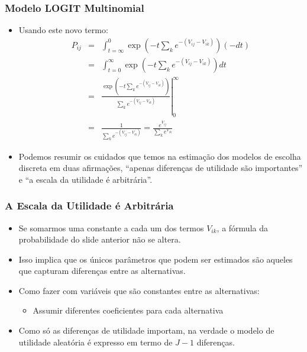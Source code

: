 \documentclass{beamer}
\begin{document}
\begin{frame}\frametitle{Modelo LOGIT Multinomial}
\begin{itemize}
\item Usando este novo termo:
\begin{eqnarray*}
P_{ij} & = & \int_{t=\infty}^{0}\exp\left(-t\sum_{k}e^{-(V_{ij}-V_{ik})}\right)(-dt)\\
 & = & \int_{t=0}^{\infty}\exp\left(-t\sum_{k}e^{-(V_{ij}-V_{ik})}\right)dt\\
 & = & \left.\frac{\exp\left(-t\sum_{k}e^{-(V_{ij}-V_{ik})}\right)}{\sum_{k}e^{-(V_{ij}-V_{ik})}}\right|_{0}^{\infty}\\
 & = & \frac{1}{\sum_{k}e^{-(V_{ij}-V_{ik})}}=\frac{e^{V_{ij}}}{\sum_{k}e^{V_{ik}}}
\end{eqnarray*}
\item Podemos resumir os cuidados que temos na estimação dos modelos de
escolha discreta em duas afirmações, ``apenas diferenças
de utilidade são importantes'' e ``a escala da
utilidade é arbitrária''. 
\end{itemize}

\end{frame}

\begin{frame}[fragile]\frametitle{A Escala da Utilidade é Arbitrária}
    \begin{itemize}
    	\item Se somarmos uma constante a cada um dos termos $V_{ik}$, a fórmula da probabilidade do slide anterior não se altera.
    	\item Isso implica que os únicos parâmetros que podem ser estimados são aqueles que capturam diferenças entre as alternativas.
    	\item Como fazer com variáveis que são constantes entre as alternativas:
    	\begin{itemize}
    		\item Assumir diferentes coeficientes para cada alternativa
    	\end{itemize}
    	\item Como só as diferenças de utilidade importam, na verdade o modelo de utilidade aleatória é expresso em termo de $J-1$ diferenças.
    \end{itemize}


\end{frame}
\end{document}
